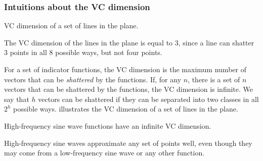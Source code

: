 \subsubsection{Intuitions about the VC dimension}
\label{sub:vc-dimension-intuition}

\begin{figurebox}[label=fig:vc-dimension]{VC dimension of a set of lines in the plane.}
  \centering
  \tcblower
  The VC dimension of the lines in the plane is equal to 3, since a line can shatter 3
  points in all 8 possible ways, but not four points.
\end{figurebox}

For a set of indicator functions, the VC dimension is the maximum number of vectors that
can be \emph{shattered} by the functions.  If, for any $n$, there is a set of $n$
vectors that can be shattered by the functions, the VC dimension is infinite.
We say that $h$ vectors can be shattered if they can be separated into two classes in all
$2^h$ possible ways.   illustrates the VC dimension of a set of
lines in the plane.

\begin{figurebox}[label=fig:vc-sin]{High-frequency sine wave functions have an infinite VC dimension.}
  \centering
  \tcblower
  High-frequency sine waves approximate any set of points well, even though they may come
  from a low-frequency sine wave or any other function.
\end{figurebox}

